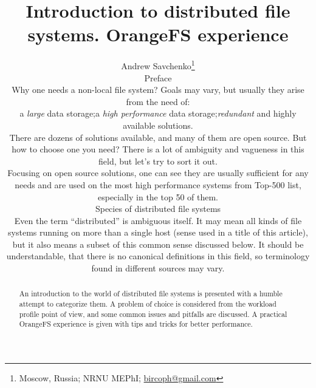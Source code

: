\documentclass[10pt, a5paper]{article}
\begin{document}
\title{Introduction to distributed file systems. OrangeFS experience}
\author{Andrew Savchenko\footnote{Moscow, Russia; NRNU MEPhI; \url{bircoph@gmail.com}}
\maketitle
\begin{abstract}
An introduction to the world of distributed file systems is presen\-ted with a humble attempt to categorize them. A problem of choice is
considered from the workload profile point of view, and some common issues and pitfalls are discussed. A practical OrangeFS experience is
given with tips and tricks for better performance.
\end{abstract}
\section*{Preface}

Why one needs a non-local file system? Goals may vary, but usually they arise from the need of:

\begin{itemize}
  \item a \emph{large} data storage;
  \item a \emph{high performance} data storage;
  \item \emph{redundant} and highly available solutions.
\end{itemize}

There are dozens of solutions available\cite{bib1}, and many of them are open source. But how to choose one you need? There is a lot of ambiguity and vagueness in this field, but let's try to sort it out.

Focusing on open source solutions, one can see they are usually sufficient for any needs and are used on the most high performance systems from Top-500\cite{bib2} list, especially in the top 50 of them.

\section*{Species of distributed file systems}

Even the term ``distributed'' is ambiguous itself. It may mean all kinds of file systems running on more than a single host (sense used in a title of this article), but it also means a subset of this common sense discussed below. It should be understandable, that there is no canonical definitions in this field, so terminology found in different sources may vary.

}
\end{document}
